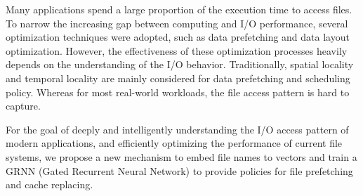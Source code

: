 \begin{cabstract}

\end{cabstract}

\begin{eabstract}
Many applications spend a large proportion of the execution time to access ﬁles. To narrow the increasing gap between computing and I/O performance, several optimization techniques were adopted, such as data prefetching and data layout optimization. However, the effectiveness of these optimization processes heavily depends on the understanding of the I/O behavior. Traditionally, spatial locality and temporal locality are mainly considered for data prefetching and scheduling policy. Whereas for most real-world workloads, the ﬁle access pattern is hard to capture.

For the goal of deeply and intelligently understanding the I/O access pattern of modern applications, and efficiently optimizing the performance of current file systems, we propose a new mechanism to embed file names to vectors and train a GRNN (Gated Recurrent Neural Network) to provide policies for file prefetching and cache replacing.
\end{eabstract}

